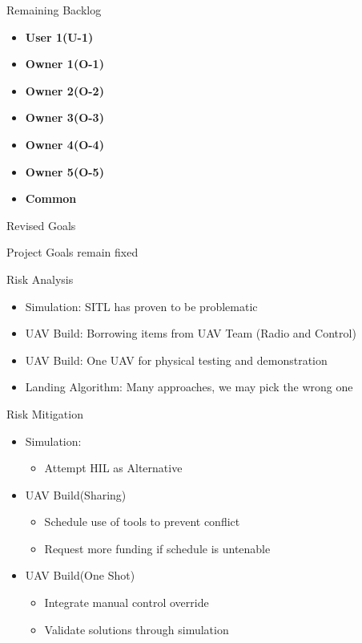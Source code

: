 \documentclass[11pt]{beamer}
\begin{document}
\begin{frame}{Remaining Backlog}
\begin{itemize}
\item \textbf{User 1(U-1)}
\item \textbf{Owner 1(O-1)}
\item \textbf{Owner 2(O-2)}
\item \textbf{Owner 3(O-3)}
\item \textbf{Owner 4(O-4)}
\item \textbf{Owner 5(O-5)}
\item \textbf{Common}
\end{itemize}

\end{frame}


\begin{frame}{Revised Goals}

Project Goals remain fixed

\end{frame}



\begin{frame}{Risk Analysis}
\begin{itemize}
\item Simulation: SITL has proven to be problematic
\item UAV Build: Borrowing items from UAV Team (Radio and Control)
\item UAV Build: One UAV for physical testing and demonstration
\item Landing Algorithm: Many approaches, we may pick the wrong one
\end{itemize}


\end{frame}

\begin{frame}{Risk Mitigation}
\begin{itemize}
\item Simulation:
\begin{itemize}
\item Attempt HIL as Alternative
\end{itemize}

\item UAV Build(Sharing)
\begin{itemize}
\item Schedule use of tools to prevent conflict
\item Request more funding if schedule is untenable
\end{itemize}

\item UAV Build(One Shot)
\begin{itemize}
\item Integrate manual control override
\item Validate solutions through simulation
\end{itemize}

\end{itemize}
\end{frame}
\end{document}
